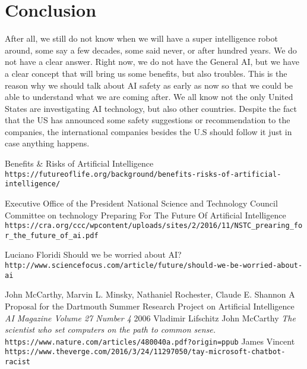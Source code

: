 \documentclass[12pt]{article}
\begin{document}
\section{Conclusion}
After all, we still do not know when we will have a super intelligence robot around, some say a few decades, some said never, or after hundred years. We do not have a clear answer. Right now, we do not have the General AI, but we have a clear concept that will bring us some benefits, but also troubles. This is the reason why we should talk about AI safety as early as now so that we could be able to understand what we are coming after. We all know not the only United States are investigating AI technology, but also other countries. Despite the fact that the US has announced some safety suggestions or recommendation to the companies, the international companies besides the U.S should follow it just in case anything happens.
\newpage
\begin{thebibliography}{9}
Benefits \& Risks of Artificial Intelligence
\\\texttt{https://futureoflife.org/background/benefits-risks-of-artificial-intelligence/}

Executive Office of the President National Science and Technology Council Committee on technology
Preparing For The Future Of Artificial Intelligence
\\\texttt{https://cra.org/ccc/wpcontent/uploads/sites/2/2016/11/NSTC{\_}prearing{\_}for{\_}the{\_}future{\_}of{\_}ai.pdf}

Luciano Floridi
Should we be worried about AI?
\\\texttt{http://www.sciencefocus.com/article/future/should-we-be-worried-about-ai}

John McCarthy, Marvin L. Minsky, Nathaniel Rochester, Claude E. Shannon
A Proposal for the Dartmouth Summer Research Project on Artificial Intelligence
\textit{AI Magazine Volume 27 Number 4}
2006
Vladimir Lifschitz
John McCarthy
\textit{The scientist who set computers on the path to common sense.}
\texttt{https://www.nature.com/articles/480040a.pdf?origin=ppub}
James Vincent
\texttt{https://www.theverge.com/2016/3/24/11297050/tay-microsoft-chatbot-racist}
\end{thebibliography}
\end{document}
